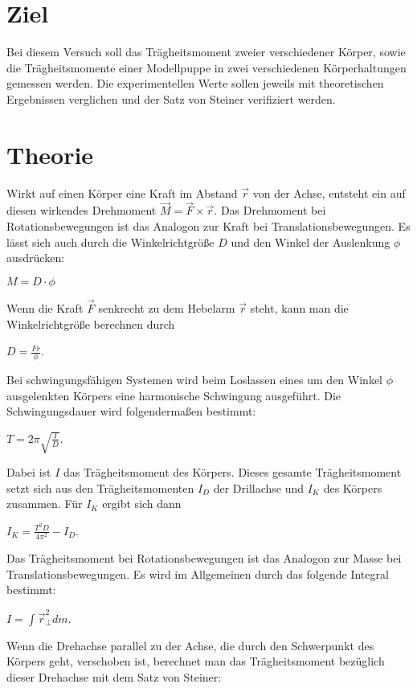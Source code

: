 


    \section{Ziel}
    Bei diesem Versuch soll das
    Trägheitsmoment zweier verschiedener
    Körper, sowie die Trägheitsmomente
    einer Modellpuppe in zwei verschiedenen
    Körperhaltungen gemessen werden.
    Die experimentellen Werte sollen
    jeweils mit theoretischen Ergebnissen
    verglichen und der Satz von Steiner
    verifiziert werden.

    \section{Theorie}
    Wirkt auf einen Körper eine Kraft
    im Abstand $\vec{r}$ von der Achse, entsteht ein auf
    diesen wirkendes Drehmoment $\vec{M} = \vec{F} \times \vec{r}$.
    Das Drehmoment bei Rotationsbewegungen ist das Analogon zur
    Kraft bei Translationsbewegungen.
    Es lässt sich auch durch die Winkelrichtgröße $D$ und den
    Winkel der Auslenkung $\phi$ ausdrücken:

    $M = D \cdot \phi$

    Wenn die Kraft $\vec{F}$ senkrecht zu dem Hebelarm $\vec{r}$
    steht, kann man die Winkelrichtgröße berechnen durch

    $D = \frac{Fr}{\phi}$.

    Bei schwingungsfähigen Systemen wird
    beim Loslassen eines um den Winkel $\phi$
    ausgelenkten Körpers eine harmonische
    Schwingung ausgeführt. Die Schwingungsdauer
    wird folgendermaßen bestimmt:

    $T = 2\pi \sqrt{\frac{I}{D}}$.

    Dabei ist $I$ das Trägheitsmoment des Körpers.
    Dieses gesamte Trägheitsmoment setzt sich aus den
    Trägheitsmomenten $I_D$ der Drillachse und $I_K$ des
    Körpers zusammen. Für $I_K$ ergibt sich dann

    $I_K = \frac{T^2D}{4 \pi^2} - I_D$.

    Das Trägheitsmoment bei Rotationsbewegungen
    ist das Analogon zur Masse bei Translationsbewegungen. Es wird im
    Allgemeinen durch das folgende Integral bestimmt:


    $I = \int \vec{r}^2_{\perp} dm$.

    
    Wenn die Drehachse parallel zu der
    Achse, die durch den Schwerpunkt des
    Körpers geht, verschoben ist, berechnet
    man das Trägheitsmoment bezüglich
    dieser Drehachse mit dem Satz
    von Steiner:


